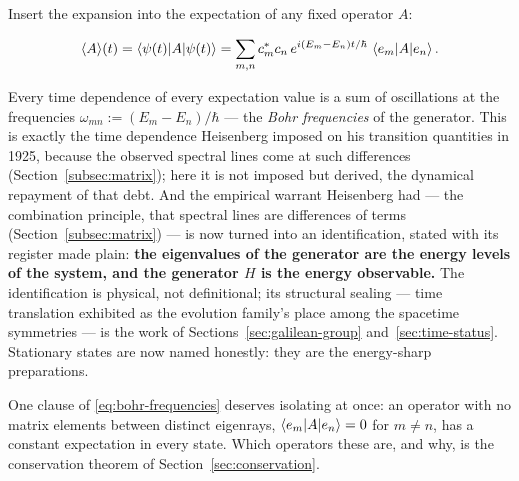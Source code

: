 Insert the expansion into the expectation of any fixed operator $A$:
\begin{linenomath}
    \begin{equation}
        \langle A\rangle(t) = \braket{\psi(t)|A|\psi(t)} = \sum_{m,n} c_m^{*}c_n\,e^{i(E_m - E_n)t/\hbar}\,\braket{e_m|A|e_n} .
        \label{eq:bohr-frequencies}
    \end{equation}
\end{linenomath}
Every time dependence of every expectation value is a sum of oscillations at the frequencies $\omega_{mn} := (E_m - E_n)/\hbar$ --- the \emph{Bohr frequencies} of the generator. This is exactly the time dependence Heisenberg imposed on his transition quantities in 1925, because the observed spectral lines come at such differences (Section~\ref{subsec:matrix}); here it is not imposed but derived, the dynamical repayment of that debt. And the empirical warrant Heisenberg had --- the combination principle, that spectral lines are differences of terms (Section~\ref{subsec:matrix}) --- is now turned into an identification, stated with its register made plain: \textbf{the eigenvalues of the generator are the energy levels of the system, and the generator $H$ is the energy observable.} The identification is physical, not definitional; its structural sealing --- time translation exhibited as the evolution family's place among the spacetime symmetries --- is the work of Sections~\ref{sec:galilean-group} and~\ref{sec:time-status}. Stationary states are now named honestly: they are the energy-sharp preparations.

One clause of \eqref{eq:bohr-frequencies} deserves isolating at once: an operator with no matrix elements between distinct eigenrays, $\braket{e_m|A|e_n} = 0$ for $m \neq n$, has a constant expectation in every state. Which operators these are, and why, is the conservation theorem of Section~\ref{sec:conservation}.

